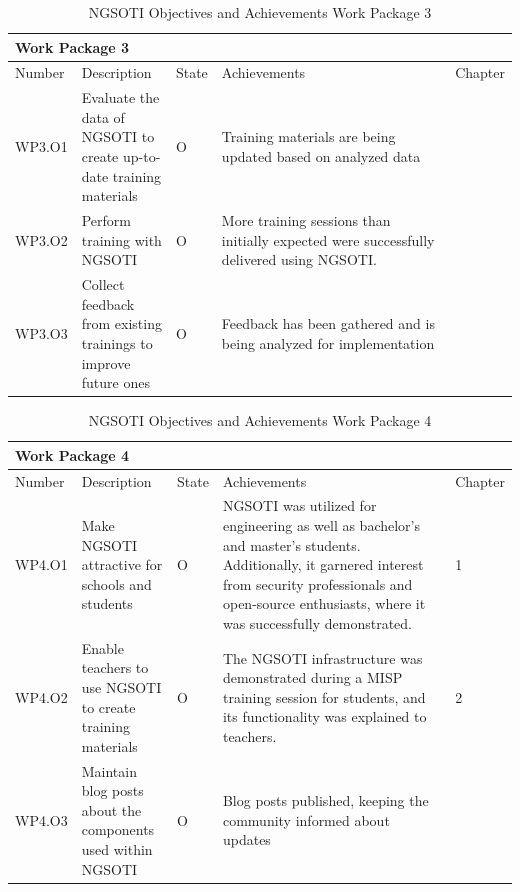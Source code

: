 \begin{table}
    \begin{tabular}{ |p{0.07\linewidth}  |p{0.2\linewidth}| p{0.04\linewidth}| p{0.62\linewidth}|  p{0.07\linewidth}| }
    \hline
    \multicolumn{5}{|p{0.97\linewidth}|}{Work Package 3} \\
    \hline
    Number & Description & State & Achievements & Chapter \\
    \hline
    WP3.O1 & Evaluate the data of NGSOTI to create up-to-date training materials & O & Training materials are being updated based on analyzed data & \\
    \hline
    WP3.O2 & Perform training with NGSOTI & O &  More training sessions than initially expected were successfully delivered using NGSOTI. &  \\
    \hline
    WP3.O3 & Collect feedback from existing trainings to improve future ones & O & Feedback has been gathered and is being analyzed for implementation &  \\
    \hline
    \end{tabular}
    \caption{NGSOTI Objectives and Achievements Work Package 3}
\label{oa3}
\end{table}


\begin{table}
        \begin{tabular}{ |p{0.07\linewidth}  |p{0.2\linewidth}| p{0.04\linewidth}| p{0.62\linewidth}|  p{0.07\linewidth}| }
        \hline
        \multicolumn{5}{|p{0.97\linewidth}|}{Work Package 4} \\
        \hline
        Number & Description & State & Achievements & Chapter \\
        \hline
        WP4.O1 & Make NGSOTI attractive for schools and students & O &NGSOTI was
        utilized for engineering as well as bachelor’s and master’s students.
        Additionally, it garnered interest from security professionals and open-source
        enthusiasts, where it was successfully demonstrated.  & 1 \\
        \hline
        WP4.O2 & Enable teachers to use NGSOTI to create training materials & O &
        The NGSOTI infrastructure was demonstrated during a MISP training session for
        students, and its functionality was explained to teachers. & 2 \\
        \hline
        WP4.O3 & Maintain blog posts about the components used within NGSOTI & O &
        Blog posts published, keeping the community informed about updates &  \\
        \hline
        \end{tabular}
    \caption{NGSOTI Objectives and Achievements Work Package 4}
    \label{oa4}
\end{table}






